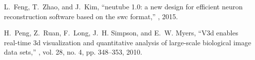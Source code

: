 \documentclass{article}
\begin{document}
{\begin{thebibliography}{9}
L.~Feng, T.~Zhao, and J.~Kim,
\newblock ``neutube 1.0: a new design for efficient neuron reconstruction software based on the swc format,''
, 2015.

H.~Peng, Z.~Ruan, F.~Long, J.~H. Simpson, and E.~W. Myers,
\newblock ``V3d enables real-time 3d visualization and quantitative analysis of large-scale biological image data sets,''
, vol. 28, no. 4, pp. 348--353, 2010.
		
\end{thebibliography}
}
\end{document}
